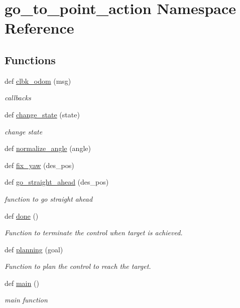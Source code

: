 \hypertarget{namespacego__to__point__action}{}\section{go\+\_\+to\+\_\+point\+\_\+action Namespace Reference}
\label{namespacego__to__point__action}
\subsection*{Functions}
\begin{DoxyCompactItemize}
\item 
def \hyperlink{namespacego__to__point__action_a071343dec01124a125b208f881e350ff}{clbk\+\_\+odom} (msg)
\begin{DoxyCompactList}\small\item\em callbacks \end{DoxyCompactList}\item 
def \hyperlink{namespacego__to__point__action_a228c91a7de8ba144bebc1621674878da}{change\+\_\+state} (state)
\begin{DoxyCompactList}\small\item\em change state \end{DoxyCompactList}\item 
def \hyperlink{namespacego__to__point__action_a595bc16b669d1573a921f2fc42d61961}{normalize\+\_\+angle} (angle)
\item 
def \hyperlink{namespacego__to__point__action_a4a5f8180b546da8703ac2dddf1a70e5d}{fix\+\_\+yaw} (des\+\_\+pos)
\item 
def \hyperlink{namespacego__to__point__action_a15dbc5b1176cdaf104c33ce8eb7e6103}{go\+\_\+straight\+\_\+ahead} (des\+\_\+pos)
\begin{DoxyCompactList}\small\item\em function to go straight ahead \end{DoxyCompactList}\item 
def \hyperlink{namespacego__to__point__action_a99cfe9dae88227814c5387387fe794c5}{done} ()
\begin{DoxyCompactList}\small\item\em Function to terminate the control when target is achieved. \end{DoxyCompactList}\item 
def \hyperlink{namespacego__to__point__action_a5bba71b4503c075067b2bbfcdf64556e}{planning} (goal)
\begin{DoxyCompactList}\small\item\em Function to plan the control to reach the target. \end{DoxyCompactList}\item 
def \hyperlink{namespacego__to__point__action_ad5e10fe384fcab186e405aac29aece7b}{main} ()
\begin{DoxyCompactList}\small\item\em main function \end{DoxyCompactList}\end{DoxyCompactItemize}
